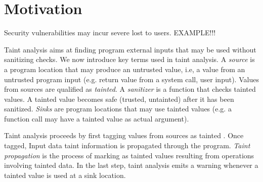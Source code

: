\section{Motivation}

Security vulnerabilities may incur severe lost to users.
EXAMPLE!!!

Taint analysis aims at finding program external inputs
that may be used without sanitizing checks.
We now introduce key terms used in taint analysis.
A \textit{source} is a program location that may produce
an untrusted value, i.e, a value from an untrusted program
input (e.g. return value from a system call, user input). 
Values from sources are qualified as \textit{tainted}.
A \textit{sanitizer} is a function that checks tainted
values. A tainted value becomes safe (trusted, untainted)
after it has been sanitized.
\textit{Sinks} are program locations that may use tainted
values (e.g. a function call may have a tainted value as
actual argument).

Taint analysis proceeds by first tagging values from sources
as tainted . Once tagged, Input data taint information is
propagated through the program.
\textit{Taint propagation} is the process of marking as tainted
values resulting from operations involving tainted data. In the
last step, taint analysis emits a warning whenever a tainted
value is used at a sink location.